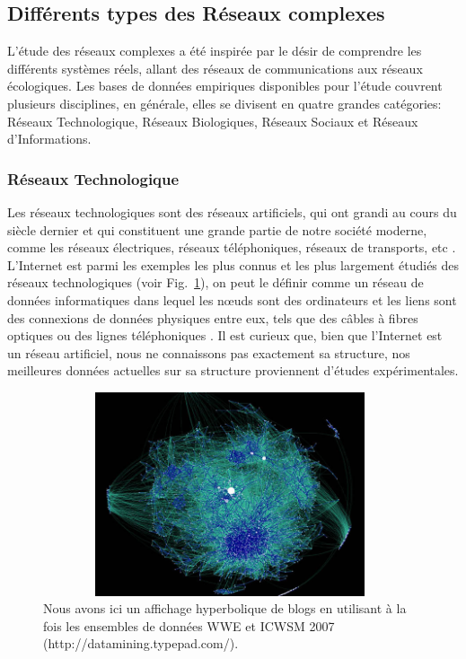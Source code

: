   \subsection{Différents types des Réseaux complexes}
  L'étude des réseaux complexes a été inspirée par le désir de comprendre les différents systèmes réels, allant des réseaux de communications aux réseaux écologiques. Les bases de données empiriques disponibles pour l'étude couvrent plusieurs disciplines, en générale, elles se divisent en quatre grandes catégories: Réseaux Technologique, Réseaux Biologiques, Réseaux Sociaux
  et Réseaux d'Informations.
  \subsubsection{Réseaux Technologique}
  Les réseaux technologiques sont des réseaux artificiels, qui ont grandi au cours du siècle dernier et qui constituent une grande partie de notre société moderne, comme les réseaux électriques, réseaux téléphoniques, réseaux de transports, etc \cite{Pi1965,Am-al2000,Do-al2007,Se-al2003}.
  L'Internet est parmi les exemples les plus connus et les plus largement étudiés des réseaux technologiques (voir Fig.~\ref{Internet}), on peut le définir comme un réseau de données informatiques dans lequel les nœuds sont des ordinateurs et les liens sont des connexions de données physiques entre eux, tels que des câbles à fibres optiques ou des lignes téléphoniques \cite{F-al1999,BC2001}. Il est curieux que, bien que l'Internet est un réseau artificiel, nous ne connaissons pas exactement sa structure, nos meilleures données actuelles sur sa structure proviennent d'études expérimentales.
  \begin{figure}[h!]
  	\centering
  	\includegraphics[width=11cm,height=6cm]{./figures/Internet3}
  	\caption{Nous avons ici un affichage hyperbolique de blogs en utilisant à la fois les ensembles de données WWE et ICWSM 2007 (http://datamining.typepad.com/).}
  	\label{Internet}
  \end{figure}

